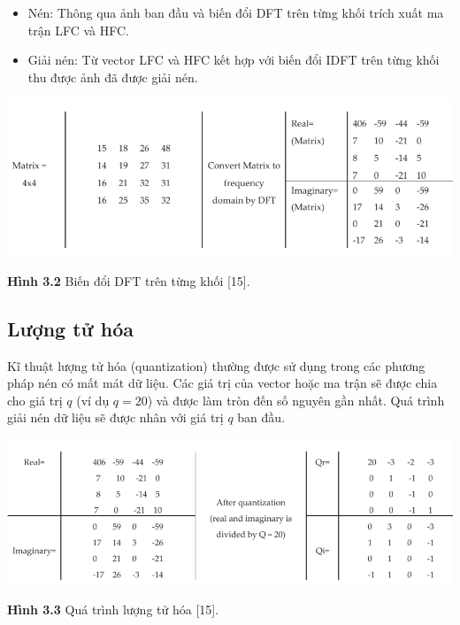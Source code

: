 \begin{itemize}
    \item Nén: Thông qua ảnh ban đầu và biến đổi DFT trên từng khối trích xuất ma trận LFC và HFC.
    \item Giải nén: Từ vector LFC và HFC kết hợp với biến đổi IDFT trên từng khối thu được ảnh đã được giải nén. 
\end{itemize}

\begin{center}
    \includegraphics[scale=0.65]{Figures/fig18.png}
    \par \textbf {Hình 3.2} Biến đổi DFT trên từng khối [15].
\end{center}
\subsection{Lượng tử hóa}
\par Kĩ thuật lượng tử hóa (quantization) thường được sử dụng trong các phương pháp nén có mất mát dữ liệu. Các giá trị của vector hoặc ma trận sẽ được chia cho giá trị $q$ (ví dụ $q=20$) và được làm tròn đến số nguyên gần nhất. Quá trình giải nén dữ liệu sẽ được nhân với giá trị $q$ ban đầu.
\begin{center}
    \includegraphics[scale=0.6]{Figures/fig19.png}
    \par \textbf {Hình 3.3} Quá trình lượng tử hóa [15].
\end{center}
